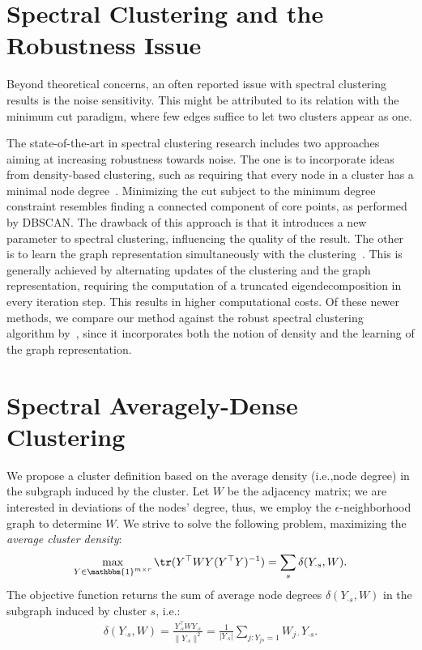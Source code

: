\section{Spectral Clustering and the Robustness Issue}
Beyond theoretical concerns, an often reported issue with spectral clustering results is the noise sensitivity. This might be attributed to its relation with the minimum cut paradigm, where few edges suffice to let two clusters appear as one.   

The state-of-the-art in spectral clustering research includes two approaches aiming at increasing robustness towards noise. The one is to incorporate ideas from density-based clustering, such as requiring that every node in a cluster has a minimal node degree~\citep{bojchevski2017robust}. Minimizing the cut subject to the minimum degree constraint resembles finding a connected component of core points, as performed by DBSCAN. The drawback of this approach is that it introduces a new parameter to spectral clustering, influencing the quality of the result.  
The other is to learn the graph representation simultaneously with the clustering~\citep{bojchevski2017robust,kang2018unified,nie2017learning}. This is generally achieved by alternating updates of the clustering and the graph representation, requiring the computation of a truncated eigendecomposition in every iteration step. This results in higher computational costs.
Of these newer methods, we compare our method against the robust spectral clustering algorithm by~\cite{bojchevski2017robust}, since it incorporates both the notion of density and the learning of the graph representation.

\section{Spectral Averagely-Dense Clustering}
We propose a cluster definition based on the average density (i.e.,\@ node degree) in the subgraph induced by the cluster. Let $W$ be the adjacency matrix; we are interested in deviations of the nodes' degree, thus, we employ the $\epsilon$-neighborhood graph to determine $W$. We strive to solve the following problem, maximizing the \emph{average cluster density}:
\begin{align}\label{eq:avgDensObj}
\max_{Y\in \mathbbm{1}^{m\times r}}\tr(Y^\top WY (Y^\top Y)^{-1})=\sum_s \delta(Y_{\cdot s},W).
\end{align}
The objective function returns the sum of average node degrees $\delta(Y_{\cdot s},W)$ in the subgraph induced by cluster $s$, i.e.:
\begin{align}\label{eq:delta}
\delta(Y_{\cdot s},W) = \frac{Y_{\cdot s}^\top W Y_{\cdot s}}{\|Y_{\cdot s}\|^2} =\frac{1}{|Y_{\cdot s}|}\sum_{j:Y_{js}=1} W_{j\cdot}Y_{\cdot s}.
\end{align}  

